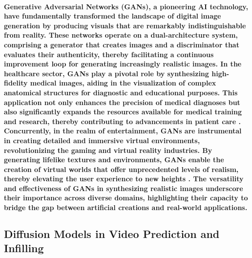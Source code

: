 \documentclass[11pt,a4paper,oneside]{report}
\begin{document}
\paragraph{Generative Adversarial Networks (GANs), a pioneering AI technology, have fundamentally transformed the landscape of digital image generation by producing visuals that are remarkably indistinguishable from reality. These networks operate on a dual-architecture system, comprising a generator that creates images and a discriminator that evaluates their authenticity, thereby facilitating a continuous improvement loop for generating increasingly realistic images. In the healthcare sector, GANs play a pivotal role by synthesizing high-fidelity medical images, aiding in the visualization of complex anatomical structures for diagnostic and educational purposes. This application not only enhances the precision of medical diagnoses but also significantly expands the resources available for medical training and research, thereby contributing to advancements in patient care \cite{granot2022drop}. Concurrently, in the realm of entertainment, GANs are instrumental in creating detailed and immersive virtual environments, revolutionizing the gaming and virtual reality industries. By generating lifelike textures and environments, GANs enable the creation of virtual worlds that offer unprecedented levels of realism, thereby elevating the user experience to new heights \cite{richter2022enhancing}. The versatility and effectiveness of GANs in synthesizing realistic images underscore their importance across diverse domains, highlighting their capacity to bridge the gap between artificial creations and real-world applications.
}
\subsection{Diffusion Models in Video Prediction and Infilling}
\end{document}
